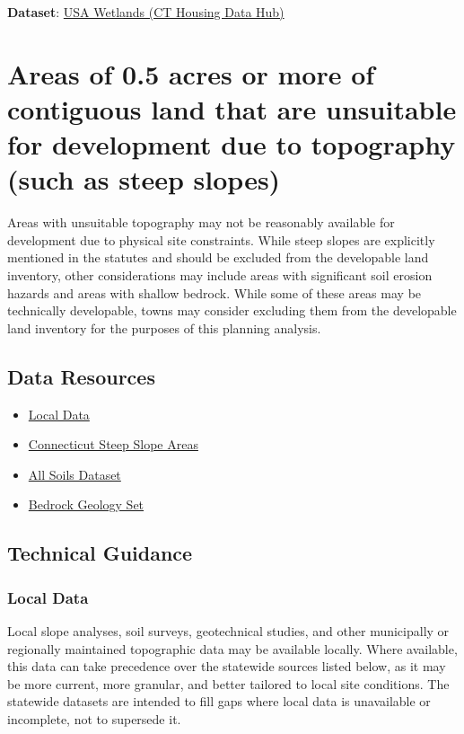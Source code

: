\documentclass[
  letterpaper,
  DIV=11,
  numbers=noendperiod]{scrreprt}
\providecommand{\tightlist}{%
  \setlength{\itemsep}{0pt}\setlength{\parskip}{0pt}}
\begin{document}
\textbf{Dataset}:
\href{https://housingmaps.ct.gov/maps/9afd2367671f43eaa4cf3972edd32350/about}{USA
Wetlands (CT Housing Data Hub)}

\section{Areas of 0.5 acres or more of contiguous land that are
unsuitable for development due to topography (such as steep
slopes)}\label{areas-of-0.5-acres-or-more-of-contiguous-land-that-are-unsuitable-for-development-due-to-topography-such-as-steep-slopes}

Areas with unsuitable topography may not be reasonably available for
development due to physical site constraints. While steep slopes are
explicitly mentioned in the statutes and should be excluded from the
developable land inventory, other considerations may include areas with
significant soil erosion hazards and areas with shallow bedrock. While
some of these areas may be technically developable, towns may consider
excluding them from the developable land inventory for the purposes of
this planning analysis.

\subsection{Data Resources}\label{data-resources-3}

\begin{itemize}
\tightlist
\item
  \hyperref[sec-local-data-topo]{Local Data}
\item
  \hyperref[sec-connecticut-steep-slope-areas]{Connecticut Steep Slope
  Areas}
\item
  \hyperref[sec-all-soils]{All Soils Dataset}
\item
  \hyperref[sec-bedrock-geology-set]{Bedrock Geology Set}
\end{itemize}

\subsection{Technical Guidance}\label{technical-guidance-3}

\subsubsection{Local Data}\label{sec-local-data-topo}

Local slope analyses, soil surveys, geotechnical studies, and other
municipally or regionally maintained topographic data may be available
locally. Where available, this data can take precedence over the
statewide sources listed below, as it may be more current, more
granular, and better tailored to local site conditions. The statewide
datasets are intended to fill gaps where local data is unavailable or
incomplete, not to supersede it.
\end{document}
